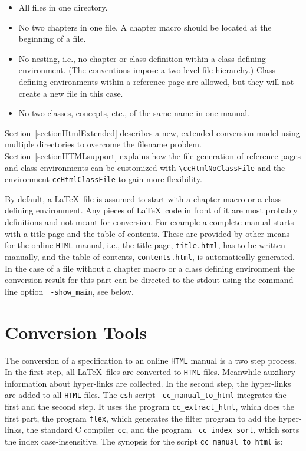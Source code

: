 \documentclass[12pt]{article}
\newcommand{\Dindex}[1]{#1\index{#1}}
\begin{document}
\begin{itemize}
  \item
    All files in one directory.
  \item
    No two chapters in one file. A chapter macro should be located at
    the beginning of a file.
  \item
    No nesting, i.e., no chapter or class definition within a class
    defining environment. (The conventions impose a two-level file
    hierarchy.) Class defining environments within a reference page
    are allowed, but they will not create a new file in this case.
  \item
    No two classes, concepts, etc., of the same name in one manual.
\end{itemize}

Section~\ref{sectionHtmlExtended} describes a new, extended conversion
model using multiple directories to overcome the filename problem.
Section~\ref{sectionHTMLsupport} explains how the file generation of
reference pages and class environments can be customized with
\verb+\ccHtmlNoClassFile+ and the environment {\tt ccHtmlClassFile} to
gain more flexibility.

By default, a \LaTeX\ file is assumed to start with a chapter macro or
a class defining environment. Any pieces of \LaTeX\ code in front of
it are most probably definitions and not meant for conversion. For
example a complete manual starts with a title page and the table of
contents. These are provided by other means for the online {\tt HTML}
manual, i.e., the title page, {\tt title.html}, has to be written
manually, and the table of contents, {\tt contents.html}, is
automatically generated.  In the case of a file without a chapter
macro or a class defining environment the conversion result for this
part can be directed to the stdout using the command line option {\tt
  -show\_main}, see below.


\section{Conversion Tools}

The conversion of a specification to an online {\tt HTML} manual is a
two step process. In the first step, all \LaTeX\ files are converted
to {\tt HTML} files. Meanwhile auxiliary information about
\Dindex{hyper-links} are collected.  In the second step, the hyper-links
are added to all {\tt HTML} files.  The {\tt csh}-script {\tt
  cc\_manual\_to\_html} integrates the first and the second step. It
uses the program {\tt cc\_extract\_html}, which does the first part,
the program {\tt flex}, which generates the filter program to add the
hyper-links, the standard C compiler {\tt cc}, and the program {\tt
  cc\_index\_sort}, which sorts the index case-insensitive. The
synopsis for the script {\tt cc\_manual\_to\_html} is:
\end{document}
